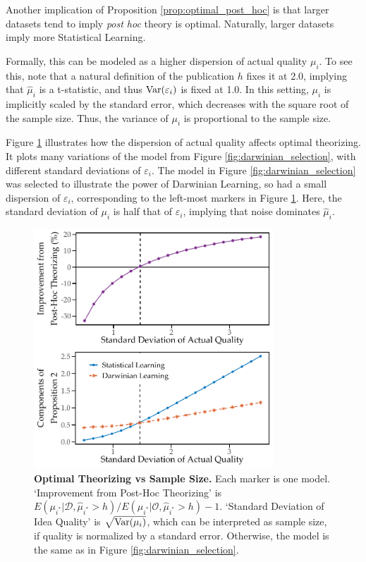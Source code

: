 \documentclass[12pt,english]{article}
\theoremstyle{plain}
\theoremstyle{plain}
\begin{document}
Another implication of Proposition \ref{prop:optimal_post_hoc} is that larger datasets tend to imply \emph{post hoc} theory is optimal. Naturally, larger datasets imply more Statistical Learning. 

Formally, this can be modeled as a higher dispersion of actual quality $\mu_i$. To see this, note that a natural definition of the publication $h$ fixes it at 2.0, implying that $\hat{\mu}_i$ is a t-statistic, and thus $\text{Var}(\varepsilon_i)$ is fixed at 1.0. In this setting, $\mu_i$ is implicitly scaled by the standard error, which decreases with the square root of the sample size. Thus, the variance of $\mu_i$ is proportional to the sample size.

Figure \ref{fig:prop2-bigdata} illustrates how the dispersion of actual quality affects optimal theorizing. It plots many variations of the model from Figure \ref{fig:darwinian_selection}, with different standard deviations of $\varepsilon_i$. The model in Figure \ref{fig:darwinian_selection} was selected to illustrate the power of Darwinian Learning, so had a small dispersion of $\varepsilon_i$, corresponding to the left-most markers in Figure \ref{fig:prop2-bigdata}. Here, the standard deviation of $\mu_i$ is half that of $\varepsilon_i$, implying that noise dominates $\hat{\mu}_i$.

\begin{figure}
    \centering
    \includegraphics[width=0.8\textwidth]{../Results/many-mu_sig.pdf}
    \caption{\textbf{Optimal Theorizing vs Sample Size.} Each marker is one model. `Improvement from Post-Hoc Theorizing' is $E\left(\mu_{i^{\ast}}|\mathcal{D}, \hat{\mu}_{i^{\ast}}>h\right)/E\left(\mu_{i^{\ast}}|\mathcal{O}, \hat{\mu}_{i^{\ast}}>h\right)-1$. `Standard Deviation of Idea Quality' is $\sqrt{\text{Var}(\mu_i)}$, which can be interpreted as sample size, if quality is normalized by a standard error. Otherwise, the model is the same as in Figure \ref{fig:darwinian_selection}.}
    \label{fig:prop2-bigdata}
\end{figure}
\end{document}
